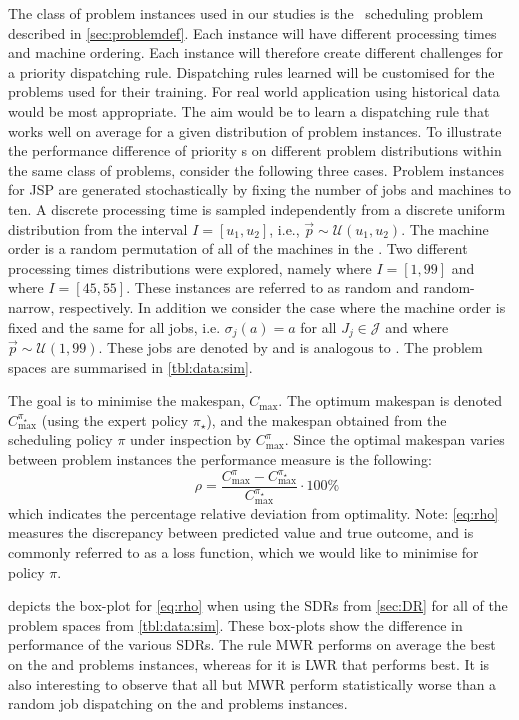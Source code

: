\documentclass[twocolumn]{svjour3}
\begin{document}
The class of problem instances used in our studies is the \jsp\ scheduling 
problem described in \cref{sec:problemdef}. Each instance will have 
different processing times and machine ordering. Each instance will 
therefore create different challenges for a priority dispatching rule. 
Dispatching rules learned will be customised for the problems used for their 
training. For real world application using historical data would be most 
appropriate. The aim would be to learn a dispatching rule that works well on 
average for a given distribution of problem instances. 
To illustrate the performance difference of priority \dr s on different 
problem distributions within the same class of problems, 
consider the following three cases.
Problem instances for JSP are generated stochastically by fixing the number of 
jobs and machines to ten. A discrete processing time is sampled independently 
from a discrete uniform distribution from the interval $I=[u_1,u_2]$, i.e., 
$\vec{p}\sim \mathcal{U}(u_1,u_2)$. 
The machine order is a random permutation of all of the machines in the 
\jsp. Two different processing times distributions were explored, namely 
 where $I=[1,99]$ and  where $I=[45,55]$. These 
instances are referred to as random and random-narrow, respectively. In 
addition we consider the case where the machine order is fixed and the same for 
all jobs, i.e. $\sigma_j(a)=a$ for all $J_j\in\mathcal{J}$ and where 
$\vec{p}\sim\mathcal{U}(1,99)$. 
These jobs are denoted by  and is analogous to .
The problem spaces are summarised in \cref{tbl:data:sim}.

The goal is to minimise the makespan, $C_{\max}$. The optimum 
makespan is denoted $C_{\max}^{\pi_\star}$ (using the expert policy 
$\pi_\star$), and the makespan obtained from the 
scheduling policy $\pi$ under inspection by $C_{\max}^{\pi}$. Since the optimal 
makespan varies between problem instances the performance measure is the 
following:
\begin{equation}\quad\label{eq:rho}
\rho=\frac{C_{\max}^{\pi}-C_{\max}^{\pi_\star}}{C_{\max}^{\pi_\star}}\cdot
100\%
\end{equation}
which indicates the percentage relative deviation from optimality. 
Note: \cref{eq:rho} measures the discrepancy between predicted value and true 
outcome, and is commonly referred to as a loss function, which we would like to 
minimise for policy $\pi$.

 depicts the box-plot for \cref{eq:rho} when using the 
SDRs from \cref{sec:DR} for all of the problem spaces from \cref{tbl:data:sim}.
These box-plots show the difference in performance of the various SDRs. The 
rule MWR performs on average the best on the  and  
problems instances, whereas for  it is LWR that performs best. It is 
also interesting to observe that all but MWR perform statistically worse than a 
random job dispatching on the  and  problems instances.
\end{document}
